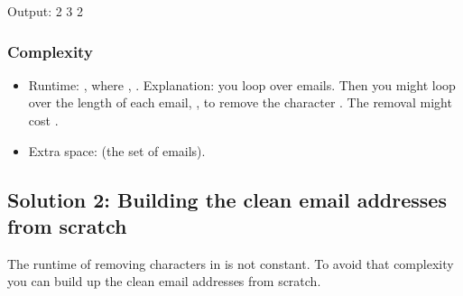 \documentclass[letterpaper,12pt,english]{book}
\begin{document}
\begin{sphinxVerbatim}[commandchars=\\\{\}]
\end{sphinxVerbatim}

\begin{sphinxVerbatim}[commandchars=\\\{\}]
Output:
2
3
2
\end{sphinxVerbatim}


\subsubsection{Complexity}
\label{\detokenize{String/08_STR_929_Unique_Email_Addresses:complexity}}\begin{itemize}
\item {} 
\sphinxAtStartPar
Runtime: , where , .
Explanation: you loop over  emails. Then you might loop over the length of each email, , to remove the character . The removal might cost .

\item {} 
\sphinxAtStartPar
Extra space:  (the set of emails).

\end{itemize}


\subsection{Solution 2: Building the clean email addresses from scratch}
\label{\detokenize{String/08_STR_929_Unique_Email_Addresses:solution-2-building-the-clean-email-addresses-from-scratch}}
\sphinxAtStartPar
The runtime of removing characters in  is not constant. To avoid that complexity you can build up the clean email addresses from scratch.
\end{document}
